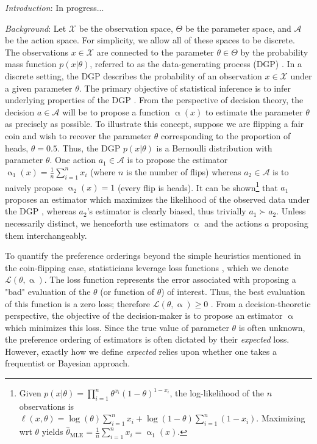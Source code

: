 \documentclass[letterpaper,12pt]{article}
\newcommand{\given}{|}
\begin{document}
\textit{Introduction}: In progress...

\textit{Background}: Let $\mathcal{X}$ be the observation space, ${\Theta}$ be the parameter space, and $\mathcal{A}$ be the action space.  For simplicity, we allow all of these spaces to be discrete.  The observations $x \in \mathcal{X}$ are connected to the parameter $\theta \in \Theta$ by the probability mass function $p(x \given \theta)$, referred to as the data-generating process (DGP) \cite{tu2004data}. In a discrete setting, the DGP describes the probability of an observation $x \in \mathcal{X}$ under a given parameter $\theta$. The primary objective of statistical inference is to infer underlying properties of the DGP \cite{upton2008oxford}. From the perspective of decision theory, the decision $a \in \mathcal{A}$ will be to propose a function $\upalpha(x)$ to estimate the parameter $\theta$ as precisely as possible. To illustrate this concept, suppose we are flipping a fair coin and wish to recover the parameter $\theta$ corresponding to the proportion of heads, $\theta = 0.5$. Thus, the DGP $p(x \given \theta)$ is a Bernoulli distribution with parameter $\theta$. One action $a_1 \in \mathcal{A}$ is to propose the estimator $\upalpha_1(x) = \frac{1}{n}\sum_{i = 1}^n x_i$ (where $n$ is the number of flips) whereas $a_2 \in \mathcal{A}$ is to naively propose $\upalpha_2 (x) = 1$ (every flip is heads). It can be shown\footnote{ Given $p(x\given \theta) = \prod_{i = 1}^n\theta^{x_i}(1-\theta)^{1-x_i}$, the log-likelihood of the $n$ observations is $\ell(x, \theta) = \log(\theta) \sum_{i = 1}^n x_i + \log(1 - \theta) \sum_{i = 1}^n (1 - x_i)$. Maximizing wrt $\theta$ yields $\hat{\theta}_{\text{MLE}} = \frac{1}{n}\sum_{i = 1}^n x_i = \upalpha_1(x)$.} that $a_1$ proposes an estimator which maximizes the likelihood of the observed data under the DGP \cite{rossi2018}, whereas $a_2$'s estimator is clearly biased, thus trivially $a_1 \succ a_2$. Unless necessarily distinct, we henceforth use estimators $\upalpha$ and the actions $a$ proposing them interchangeably. 

To quantify the preference orderings beyond the simple heuristics mentioned in the coin-flipping case, statisticians leverage loss functions  \cite{wald1950}, which we denote $\mathcal{L}(\theta, \upalpha)$. The loss function represents the error associated with proposing a "bad" evaluation of the $\theta$ (or function of $\theta$) of interest. Thus, the best evaluation of this function is a zero loss; therefore $\mathcal{L}(\theta, \upalpha) \geq 0$ \cite{robert2007bayesian}. From a decision-theoretic perspective, the objective of the decision-maker is to propose an estimator $\upalpha$ which minimizes this loss. Since the true value of parameter $\theta$ is often unknown, the preference ordering of estimators is often dictated by their \textit{expected} loss. However, exactly how we define \textit{expected} relies upon whether one takes a {frequentist} or {Bayesian} approach. 
\end{document}
